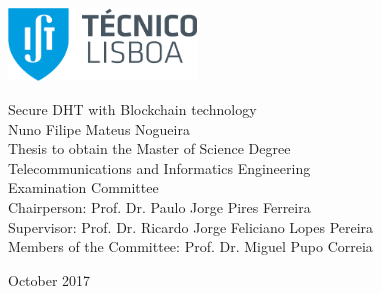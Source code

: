 \thispagestyle {empty}

\includegraphics[width=5.0cm]{Logo.png}

\begin{center}
%

\vspace{0.8cm}
{\FontLb Secure DHT with Blockchain technology} \\
\vspace{2.6cm}
{\FontMb Nuno Filipe Mateus Nogueira} \\
\vspace{1.9cm}
{\FontLn Thesis to obtain the Master of Science Degree} \\
\vspace{0.3cm}
{\FontLb Telecommunications and Informatics Engineering} \\
\vspace{1.9cm}
{\FontMb Examination Committee} \\
\vspace{0.3cm}
{\FontSn %
  Chairperson:        Prof. Dr. Paulo Jorge Pires Ferreira \\
Supervisor:        Prof. Dr. Ricardo Jorge Feliciano Lopes Pereira \\
Members of the Committee:            Prof. Dr. Miguel Pupo Correia \\
}
\vspace{1.5cm}

{\FontMb October 2017} \\
%
\end{center}

\cleardoublepage

\restoregeometry
